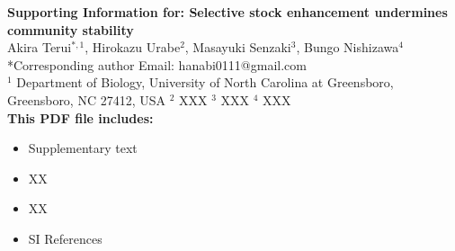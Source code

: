 \begin{flushleft}
\LARGE{\textbf{Supporting Information for: \newline Selective stock enhancement undermines community stability}}\\
\vspace*{\baselineskip}
\large{Akira Terui$^{*,1}$, Hirokazu Urabe$^2$, Masayuki Senzaki$^3$, Bungo Nishizawa$^4$}\\
\vspace*{1\baselineskip}
\normalsize{*Corresponding author \newline Email: hanabi0111@gmail.com}\\
\vspace*{1\baselineskip}
\normalsize{
$^1$ Department of Biology, University of North Carolina at Greensboro, Greensboro, NC 27412, USA \newline
$^2$ XXX \newline
$^3$ XXX \newline
$^4$ XXX}\\
\vspace*{2\baselineskip}
\textbf{This PDF file includes:}
\begin{itemize}
\item Supplementary text
\item XX
\item XX
\item SI References
\end{itemize}
\end{flushleft}

\newpage